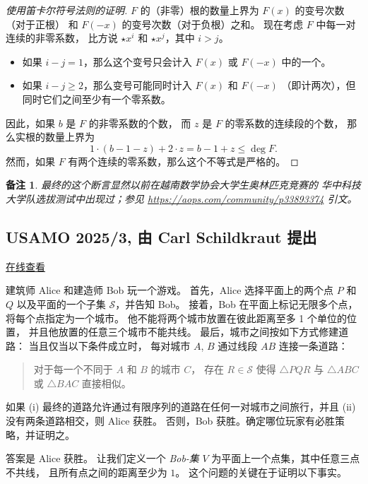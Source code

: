 \documentclass[11pt]{article}
\theoremstyle{claimstyle}
\theoremstyle{remarkstyle}
\newtheorem{remark}{备注}
\begin{document}
\begin{proof}[使用笛卡尔符号法则的证明]
  $F$ 的（非零）根的数量上界为
  $F(x)$ 的变号次数（对于正根）
  和 $F(-x)$ 的变号次数（对于负根）之和。
  现在考虑 $F$ 中每一对连续的非零系数，
  比方说 ${\star} x^i$ 和 ${\star} x^j$，其中 $i > j$。
  \begin{itemize}
    \item 如果 $i-j=1$，那么这个变号只会计入 $F(x)$ 或 $F(-x)$ 中的一个。
    \item 如果 $i-j \ge 2$，那么变号可能同时计入 $F(x)$ 和 $F(-x)$
    （即计两次），但同时它们之间至少有一个零系数。
  \end{itemize}
  因此，如果 $b$ 是 $F$ 的非零系数的个数，
  而 $z$ 是 $F$ 的零系数的连续段的个数，
  那么实根的数量上界为
  \[ 1 \cdot (b-1-z) + 2 \cdot z = b - 1 + z \le \deg F. \]
  然而，如果 $F$ 有两个连续的零系数，那么这个不等式是严格的。
\end{proof}

\begin{remark}
  最终的这个断言显然以前在越南数学协会大学生奥林匹克竞赛的
  华中科技大学队选拔测试中出现过；参见 \url{https://aops.com/community/p33893374} 引文。
\end{remark}

\pagebreak

\subsection{USAMO 2025/3, 由 Carl Schildkraut 提出}
\href{https://aops.com/community/p34326775}{在线查看}

\begin{problembox}
建筑师 Alice 和建造师 Bob 玩一个游戏。
首先，Alice 选择平面上的两个点 $P$ 和 $Q$ 以及平面的一个子集 $\mathcal{S}$，并告知 Bob。
接着，Bob 在平面上标记无限多个点，将每个点指定为一个城市。
他不能将两个城市放置在彼此距离至多 1 个单位的位置，
并且他放置的任意三个城市不能共线。
最后，城市之间按如下方式修建道路：
当且仅当以下条件成立时，
每对城市 $A$, $B$ 通过线段 $AB$ 连接一条道路：
\begin{quote}
对于每一个不同于 $A$ 和 $B$ 的城市 $C$，
存在 $R\in \mathcal{S}$ 使得 $\triangle PQR$ 与 $\triangle ABC$ 或 $\triangle BAC$ 直接相似。
\end{quote}
如果 (i) 最终的道路允许通过有限序列的道路在任何一对城市之间旅行，并且 (ii) 没有两条道路相交，则 Alice 获胜。
否则，Bob 获胜。确定哪位玩家有必胜策略，并证明之。
\end{problembox}

答案是 Alice 获胜。
让我们定义一个 \emph{Bob-集} $V$ 为平面上一个点集，其中任意三点不共线，
且所有点之间的距离至少为 $1$。
这个问题的关键在于证明以下事实。
\end{document}

